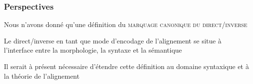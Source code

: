 \begin{frame}
\frametitle{Perspectives}
\footnotesize
\begin{wideitemize}%
\item[\highlighti{\danger}] Nous n'avons donné qu'une définition du
  \textsc{marquage canonique du direct/inverse}
\item Le direct/inverse en tant que mode d'encodage de l'alignement se
  situe à l'interface entre la morphologie, la syntaxe et la sémantique
\item Il serait à présent nécessaire d'étendre cette définition au
  domaine syntaxique et à la théorie de l'alignement
\end{wideitemize}
\end{frame}




